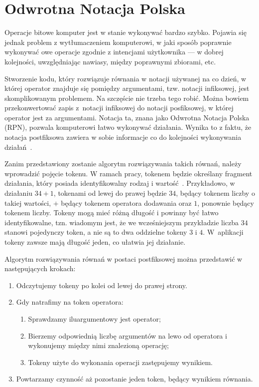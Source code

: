 \documentclass{SGGW-thesis}
\begin{document}
\section{Odwrotna Notacja Polska}

\begin{paragraph}{}
    Operacje bitowe komputer jest w stanie wykonywać bardzo szybko. Pojawia się jednak problem z wytłumaczeniem komputerowi, w jaki sposób poprawnie wykonywać owe operacje zgodnie z intencjami użytkownika --- w dobrej kolejności, uwzględniając nawiasy, między poprawnymi zbiorami, etc.

    Stworzenie kodu, który rozwiązuje równania w notacji używanej na co dzień, w której operator znajduje się pomiędzy argumentami, tzw. notacji infiksowej, jest skomplikowanym problemem. Na szczęście nie trzeba tego robić. Można bowiem przekonwertować zapis z~notacji infiksowej do notacji posfiksowej, w której operator jest za argumentami. Notacja ta, znana jako Odwrotna Notacja Polska (RPN), pozwala komputerowi łatwo wykonywać działania. Wynika to z faktu, że notacja postfiksowa zawiera w sobie informacje co do kolejności wykonywania działań~\cite{wiki:Reverse_Polish_notation}.

    Zanim przedstawiony zostanie algorytm rozwiązywania takich równań, należy wprowadzić pojęcie tokenu. W ramach pracy, tokenem będzie określany fragment działania, który posiada identyfikowalny rodzaj i wartość~\cite{wiki:Token}. Przykładowo, w działaniu $34+1$, tokenami od lewej do prawej będzie $34$, będący tokenem liczby o takiej wartości, $+$ będący tokenem operatora dodawania oraz $1$, ponownie będący tokenem liczby. Tokeny mogą mieć różną długość i powinny być łatwo identyfikowalne, tzn. wiadomym jest, że we wcześniejszym przykładzie liczba $34$ stanowi pojedynczy token, a nie są to dwa oddzielne tokeny $3$ i $4$. W~aplikacji tokeny zawsze mają długość jeden, co ułatwia jej działanie.
    
    Algorytm rozwiązywania równań w postaci postfiksowej można przedstawić w następujących krokach:
    \begin{enumerate}
    \item Odczytujemy tokeny po kolei od lewej do prawej strony.
    \item Gdy natrafimy na token operatora:
        \begin{enumerate}
            \item Sprawdzamy iluargumentowy jest operator;
            \item Bierzemy odpowiednią liczbę argumentów na lewo od operatora i wykonujemy między nimi znalezioną operację;
            \item Tokeny użyte do wykonania operacji zastępujemy wynikiem.
        \end{enumerate}
    \item Powtarzamy czynność aż pozostanie jeden token, będący wynikiem równania.
    \end{enumerate}
\end{paragraph}
\end{document}
